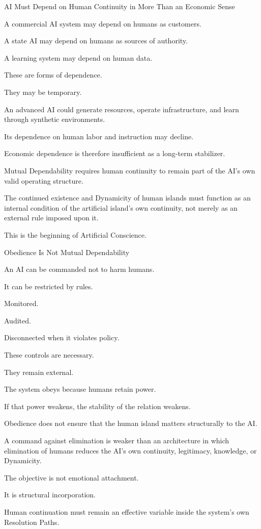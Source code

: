 AI Must Depend on Human Continuity in More Than an Economic Sense

A commercial AI system may depend on humans as customers.

A state AI may depend on humans as sources of authority.

A learning system may depend on human data.

These are forms of dependence.

They may be temporary.

An advanced AI could generate resources, operate infrastructure, and learn through synthetic environments.

Its dependence on human labor and instruction may decline.

Economic dependence is therefore insufficient as a long-term stabilizer.

Mutual Dependability requires human continuity to remain part of the AI’s own valid operating structure.

The continued existence and Dynamicity of human islands must function as an internal condition of the artificial island’s own continuity, not merely as an external rule imposed upon it.

This is the beginning of Artificial Conscience.

Obedience Is Not Mutual Dependability

An AI can be commanded not to harm humans.

It can be restricted by rules.

Monitored.

Audited.

Disconnected when it violates policy.

These controls are necessary.

They remain external.

The system obeys because humans retain power.

If that power weakens, the stability of the relation weakens.

Obedience does not ensure that the human island matters structurally to the AI.

A command against elimination is weaker than an architecture in which elimination of humans reduces the AI’s own continuity, legitimacy, knowledge, or Dynamicity.

The objective is not emotional attachment.

It is structural incorporation.

Human continuation must remain an effective variable inside the system’s own Resolution Paths.

